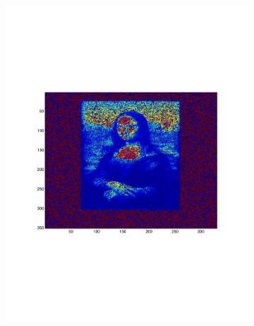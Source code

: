 \begin{figure}[h!tbp]
\begin{subfigure}[a]{0.3\textwidth}
        \includegraphics[width=\textwidth]{img/p5_mona1.pdf}
    \end{subfigure}
    \begin{subfigure}[a]{0.3\textwidth}

\end{subfigure}
\end{figure}
